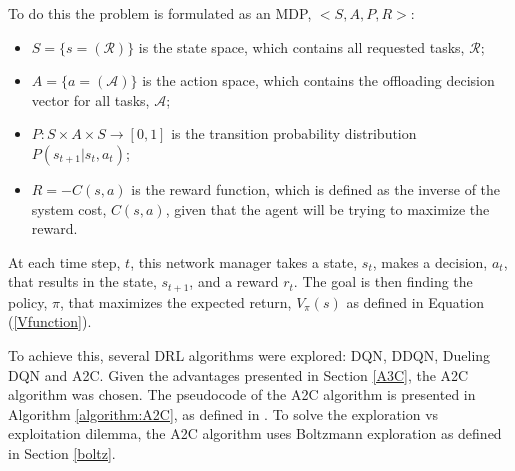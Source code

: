 To do this the problem is formulated as an \acrshort{MDP}, $<S, A, P, R>$:
\begin{itemize}
    \item $S=\{s=(\mathcal{R})\}$ is the state space, which contains all requested tasks, $\mathcal{R}$;
    \item $A=\{a=(\mathcal{A})\}$ is the action space, which contains the offloading decision vector for all tasks, $\mathcal{A}$;
    \item $P:S \times A \times S \rightarrow [0, 1]$ is the transition probability distribution $P(s_{t+1}|s_t, a_t)$;
    \item $R = -C(s,a)$ is the reward function, which is defined as the inverse of the system cost, $C(s,a)$, given that the agent will be trying to maximize the reward.
\end{itemize}

At each time step, $t$, this network manager takes a state, $s_t$, makes a decision, $a_t$, that results in the state, $s_{t+1}$, and a reward $r_t$. The goal is then finding the policy, $\pi$, that maximizes the expected return, $V_\pi(s)$ as defined in Equation (\ref{Vfunction}).

To achieve this, several \acrshort{DRL} algorithms were explored: \acrshort{DQN}, \acrshort{DDQN}, \acrshort{Dueling DQN} and \acrshort{A2C}. Given the advantages presented in Section \ref{A3C}, the \acrshort{A2C} algorithm was chosen. The pseudocode of the \acrshort{A2C} algorithm is presented in Algorithm \ref{algorithm:A2C}, as defined in \cite{a3c}. To solve the exploration vs exploitation dilemma, the \acrshort{A2C} algorithm uses Boltzmann exploration as defined in Section \ref{boltz}.

